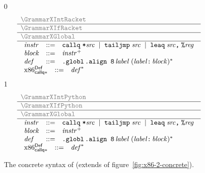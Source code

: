 \documentclass[7x10]{TimesAPriori_MIT}%
\newcommand{\gray}[1]{{\color{gray} #1}}
\def\racketEd{0}
\def\pythonEd{1}
\def\edition{1}
\numberwithin{theorem}{chapter}
\numberwithin{definition}{chapter}
\numberwithin{equation}{chapter}
\begin{document}
\newcommand{\GrammarXIndCall}{
\begin{array}{lcl}
\Instr &::=&  \key{callq}\;\key{*}\Src \MID \key{tailjmp}\;\Src 
     \MID \key{leaq}\;\Src\key{,}\;\key{\%}\Reg \\
\Block &::= & \Instr^{+} \\
\Def &::= & \code{.globl}\,\code{.align 8}\,\itm{label}\; (\itm{label}\key{:}\, \Block)^{*} 
\end{array}
}

\newcommand{\ASTXIndCallRacket}{
\begin{array}{lcl}
  \Instr &::=& \INDCALLQ{\Src}{\itm{int}}
    \MID \TAILJMP{\Src}{\itm{int}}\\
    &\MID& \BININSTR{\code{'leaq}}{\Src}{\REG{\Reg}}\\
  \Block &::= & \BLOCK{\itm{info}}{\LP\Instr\ldots\RP}\\
  \Def &::= & \DEF{\itm{label}}{\code{'()}}{\Type}{\itm{info}}{\LP\LP\itm{label}\,\key{.}\,\Block\RP\ldots\RP} 
\end{array}
}

\begin{figure}[tp]
  \begin{tcolorbox}[colback=white]
\small
{\if\edition\racketEd
\[
\begin{array}{l}
  \gray{\GrammarXIntRacket} \\ \hline
  \gray{\GrammarXIfRacket} \\ \hline
  \gray{\GrammarXGlobal} \\ \hline
  \GrammarXIndCall \\
\begin{array}{lcl}
\LangXIndCallM{} &::= & \Def^{*}
\end{array}
\end{array}
\]
\fi}
{\if\edition\pythonEd
\[
\begin{array}{l}
  \gray{\GrammarXIntPython} \\ \hline
  \gray{\GrammarXIfPython} \\ \hline
  \gray{\GrammarXGlobal} \\ \hline
  \GrammarXIndCall \\
\begin{array}{lcl}
\LangXIndCallM{} &::= & \Def^{*}
\end{array}
\end{array}
\]
\fi}
  \end{tcolorbox}

\caption{The concrete syntax of \LangXIndCall{} (extends \LangXGlobal{} of figure~\ref{fig:x86-2-concrete}).}
\label{fig:x86-3-concrete}
\end{figure}
\end{document}
